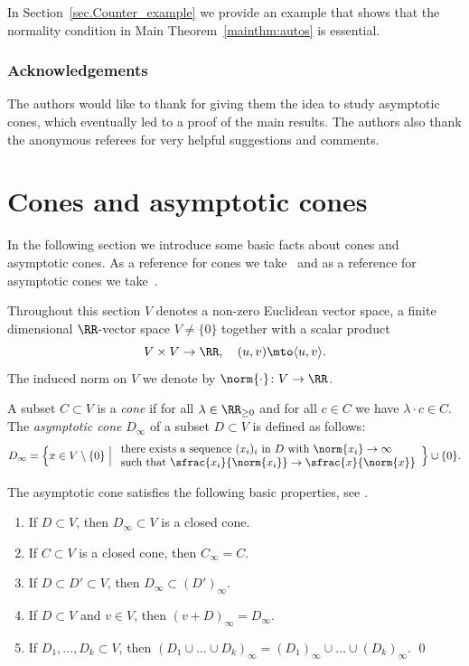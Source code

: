 In Section~\ref{sec.Counter_example} we provide an example that shows that the normality
condition in Main Theorem~\ref{mainthm:autos} is essential.

\subsubsection*{Acknowledgements}
The authors would like to thank  for giving them the idea to
study asymptotic cones, which eventually led to a proof of the main results.
The authors also thank the anonymous referees for very helpful suggestions and comments.

\section{Cones and asymptotic cones}
\label{sec.Cones_and_asymptotic_cones}
In the following section we introduce some basic facts about cones and asymptotic cones.
As a reference for cones we take~\cite[\S1.2]{Fu1993Introduction-to-to} and as a
reference for asymptotic cones we take~\cite[Chap.\,2]{AuTe2003Asymptotic-cones-a}.

Throughout this section $V$ denotes a non-zero Euclidean vector space, \ie a finite dimensional $\RR$-vector space $V \neq \{0\}$
together with a scalar product
\[
V \times V \to \RR, \quad (u, v) \mto \langle u, v \rangle.
\]
The induced norm on $V$ we denote by $\norm{\cdot} \colon V \to \RR$.

A subset $C \subset V$ is a \emph{cone} if
for all $\lambda \in \RR_{\geq 0}$ and for all $c \in C$ we have
$\lambda \cdot c \in C$.
The \emph{asymptotic cone} $D_{\infty}$
of a subset $D \subset V$ is defined as follows:
\[
D_{\infty} = \Bigl\{x \in V \setminus \{0\} \Bigm|
\begin{array}{l}
\textrm{there exists a sequence $(x_i)_i$ in $D$ with $\norm{x_i} \to \infty$} \\
\textrm{such that $\sfrac{x_i}{\norm{x_i}} \to \sfrac{x}{\norm{x}}$}
\end{array}
\Bigr\} \cup \{0\}.
\]

The asymptotic cone satisfies the following basic properties, see
\eg \cite[Prop.\,2.1.1, Prop.\,2.1.9]{AuTe2003Asymptotic-cones-a}.

\skpt
\begin{lemma}
\label{lem.Properties_asymptotic_cone}
\begin{enumerate}
\item If $D \subset V$, then $D_{\infty} \subset V$
is a closed cone.
\item If $C \subset V$ is a closed cone, then $C_{\infty} = C$.
\item If $D \subset D' \subset V$, then $D_\infty \subset (D')_{\infty}$.
\item If $D \subset V$ and $v \in V$, then
$(v+D)_{\infty} = D_{\infty}$.
\item If $D_1, \ldots, D_k \subset V$, then
$(D_1 \cup \ldots \cup D_k)_{\infty} =
(D_1)_{\infty} \cup \ldots \cup (D_k)_{\infty}$. \qed
\end{enumerate}
\end{lemma}

